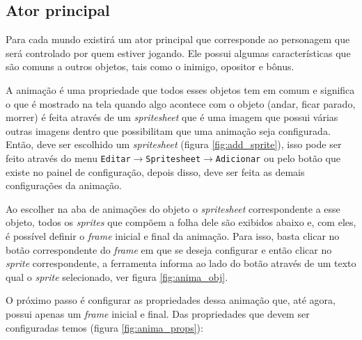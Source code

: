 \documentclass[12pt,oneside,openright,a4paper,english,brazil,sumario=tradicional]{abntex2}
\begin{document}
\begin{anexosenv}
   \section{Ator principal}
   Para cada mundo existirá um ator principal que corresponde ao personagem que será controlado por quem estiver jogando.
   Ele possui algumas características que são comuns a outros objetos, tais como o inimigo, opositor e bônus.

   A animação é uma propriedade que todos esses objetos tem em comum e significa o que é mostrado na tela quando algo acontece com o objeto (andar, ficar parado, morrer) é feita através de um \emph{spritesheet} que é uma imagem que possui várias outras imagens dentro que possibilitam que uma animação seja configurada. Então, deve ser escolhido um \emph{spritesheet} (figura \ref{fig:add_sprite}), isso pode ser feito através do menu \texttt{Editar$\rightarrow$Spritesheet$\rightarrow$Adicionar} ou pelo botão que existe no painel de configuração, depois disso, deve ser feita as demais configurações da animação.

   Ao escolher na aba de animações do objeto o \emph{spritesheet} correspondente a esse objeto, todos os \emph{sprites} que compõem a folha dele são exibidos abaixo e, com eles, é possível definir o \textit{frame} inicial e final da animação. Para isso, basta clicar no botão correspondente do \textit{frame} em que se deseja configurar e então clicar no \emph{sprite} correspondente, a ferramenta informa ao lado do botão através de um texto qual o \emph{sprite} selecionado, ver figura \ref{fig:anima_obj}.

   O próximo passo é configurar as propriedades dessa animação que, até agora, possui apenas um \textit{frame} inicial e final. Das propriedades que devem ser configuradas temos (figura \ref{fig:anima_props}):


\end{anexosenv}
\end{document}
